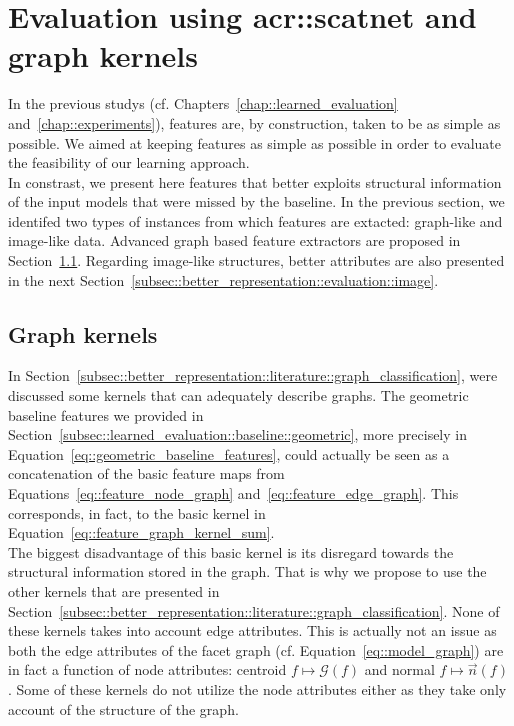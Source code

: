 \section{Evaluation using \texorpdfstring{\acrshort{acr::scatnet}}{ScatNet} and graph kernels}
    \label{sec::better_representation::evaluation}
    In the previous studys (cf. Chapters~\ref{chap::learned_evaluation} and~\ref{chap::experiments}), features are, by construction, taken to be as simple as possible.
    We aimed at keeping features as simple as possible in order to evaluate the feasibility of our learning approach.\\

    In constrast, we present here features that better exploits structural information of the input models that were missed by the baseline.
    In the previous section, we identifed two types of instances from which features are extacted: graph-like and image-like data.
    Advanced graph based feature extractors are proposed in Section~\ref{subsec::better_representation::evaluation::graph}.
    Regarding image-like structures, better attributes are also presented in the next Section~\ref{subsec::better_representation::evaluation::image}.

    \subsection{Graph kernels}
        \label{subsec::better_representation::evaluation::graph}
        In Section~\ref{subsec::better_representation::literature::graph_classification}, were discussed some kernels that can adequately describe graphs.
        The geometric baseline features we provided in Section~\ref{subsec::learned_evaluation::baseline::geometric}, more precisely in Equation~\ref{eq::geometric_baseline_features}, could actually be seen as a concatenation of the basic feature maps from Equations~\ref{eq::feature_node_graph} and~\ref{eq::feature_edge_graph}.
        This corresponds, in fact, to the basic kernel in Equation~\ref{eq::feature_graph_kernel_sum}.\\

        The biggest disadvantage of this basic kernel is its disregard towards the structural information stored in the graph.
        That is why we propose to use the other kernels that are presented in Section~\ref{subsec::better_representation::literature::graph_classification}.
        None of these kernels takes into account edge attributes.
        This is actually not an issue as both the edge attributes of the facet graph (cf. Equation~\ref{eq::model_graph}) are in fact a function of node attributes: centroid \(f \mapsto \mathscr{G}\left(f\right)\) and normal \(f \mapsto \vec{n}\left(f\right)\).
        Some of these kernels do not utilize the node attributes either as they take only account of the structure of the graph.\\

